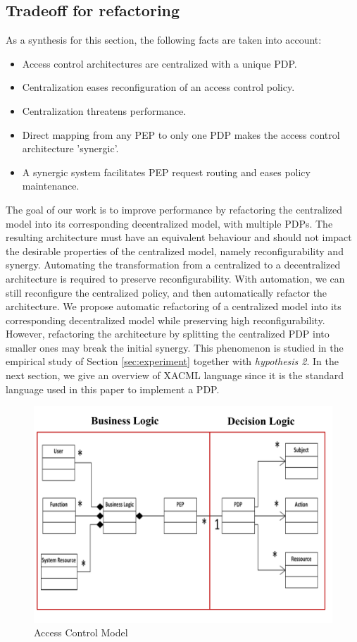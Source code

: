 \subsection{Tradeoff for refactoring}
As a synthesis for this section, the following facts are taken into account:
\begin{itemize}
\item Access control architectures are centralized with a unique PDP.
\item Centralization eases reconfiguration of an access control policy.
\item Centralization threatens performance.
\item Direct mapping from any PEP to only one PDP makes the access control architecture 'synergic'.
\item A synergic system facilitates PEP request routing and eases policy maintenance.
\end{itemize}
The goal of our work is to improve performance by refactoring the centralized model into its corresponding decentralized model, with multiple PDPs. The resulting
 architecture must have an equivalent behaviour and should not impact the desirable properties of the centralized model, namely reconfigurability and synergy. 
Automating the transformation from a centralized to a decentralized architecture is required to preserve reconfigurability. With automation, we can still reconfigure the centralized policy, 
and then automatically refactor the architecture. We propose automatic refactoring  of a centralized model into its corresponding decentralized model while preserving high 
reconfigurability. However, refactoring the architecture by splitting the centralized PDP into smaller ones may break the initial synergy. 
This phenomenon is studied in the empirical study of Section \ref{sec:experiment} together with \textit{hypothesis 2}. In the next section, 
we give an overview of XACML language since it is the standard language used in this paper to implement a PDP.
\begin{figure}[!h]
\begin{center}
\includegraphics[scale=0.34]{model}
\caption{Access Control Model}
\label{model}
\end{center}
\end{figure}
